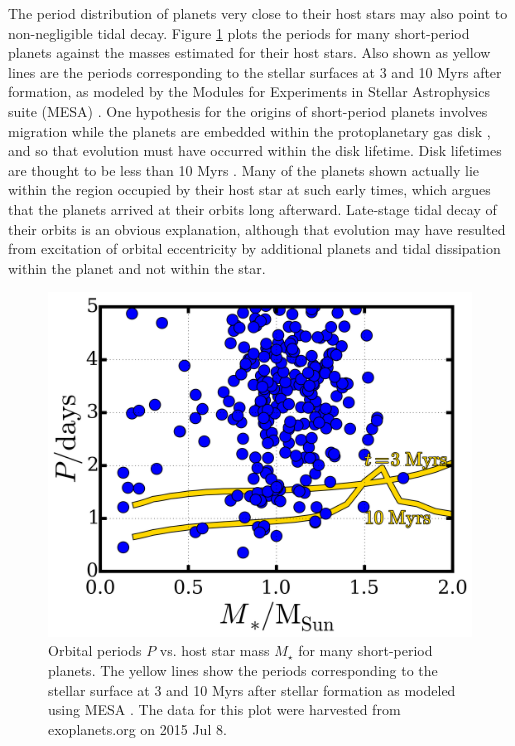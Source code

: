 \documentclass{svjour3}                     %
\begin{document}
The period distribution of planets very close to their host stars may also point to non-negligible tidal decay. Figure \ref{fig:P-vs-Mstar} plots the periods for many short-period planets against the masses estimated for their host stars. Also shown as yellow lines are the periods corresponding to the stellar surfaces at 3 and 10 Myrs after formation, as modeled by the Modules for Experiments in Stellar Astrophysics suite (MESA) \cite{2011ApJS..192....3P}. One hypothesis for the origins of short-period planets involves migration while the planets are embedded within the protoplanetary gas disk \cite{2009AREPS..37..321C}, and so that evolution must have occurred within the disk lifetime. Disk lifetimes are thought to be less than 10 Myrs \cite{2013MNRAS.434..806B}. Many of the planets shown actually lie within the region occupied by their host star at such early times, which argues that the planets arrived at their orbits long afterward. Late-stage tidal decay of their orbits is an obvious explanation, although that evolution may have resulted from excitation of orbital eccentricity by additional planets and tidal dissipation within the planet \cite{2014PhDT.........4V} and not within the star. 

\begin{figure}
\includegraphics[width=\textwidth]{P-vs-Mstar}
\caption{Orbital periods $P$ vs. host star mass $M_\star$ for many short-period planets. The yellow lines show the periods corresponding to the stellar surface at 3 and 10 Myrs after stellar formation as modeled using MESA \cite{2011ApJS..192....3P}. The data for this plot were harvested from exoplanets.org on 2015 Jul 8.}
\label{fig:P-vs-Mstar}
\end{figure}
\end{document}
